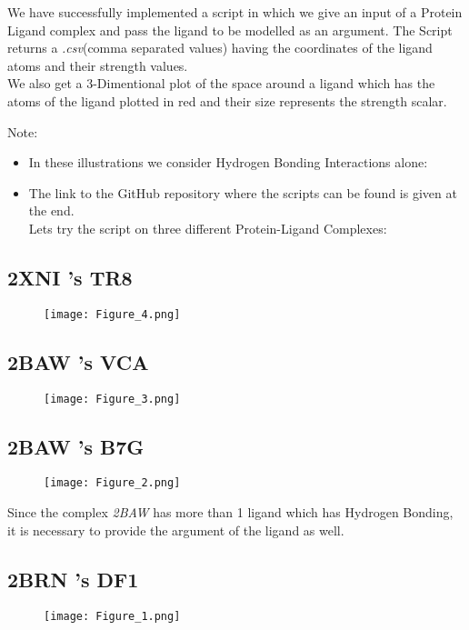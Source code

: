 \documentclass[12pt]{article}%
\begin{document}
We have successfully implemented a script in which we give an input of a Protein Ligand complex and pass the ligand to be modelled as an argument. The Script returns a \emph{.csv}(comma separated values) having the coordinates of the ligand atoms and their strength values. \\
We also get a 3-Dimentional plot of the space around a ligand which has the atoms of the ligand plotted in  red and their size represents the strength scalar. \\

\begin{Large}
Note:
\end{Large}
\begin{itemize}
\item In these illustrations we consider Hydrogen Bonding Interactions alone:

\item The link to the GitHub repository where the scripts can be found is given at the end. \\

Lets try the script on three different Protein-Ligand Complexes:
\end{itemize}
\subsection{2XNI 's TR8}
\begin{figure}[h]
\centering
\texttt{[image: Figure\_4.png]}
\end{figure}			
\newpage
\subsection{2BAW 's VCA}
\begin{figure}[h]
\centering
\texttt{[image: Figure\_3.png]}
\end{figure}			

\subsection{2BAW 's B7G}
\begin{figure}[h]
\centering
\texttt{[image: Figure\_2.png]}
\end{figure}

Since the complex \emph{2BAW} has more than 1 ligand which has Hydrogen Bonding, it is necessary to provide the argument of the ligand as well.
\newpage
\subsection{2BRN 's DF1}
\begin{figure}[h]
\centering
\texttt{[image: Figure\_1.png]}
\end{figure}			
			
\end{document}
